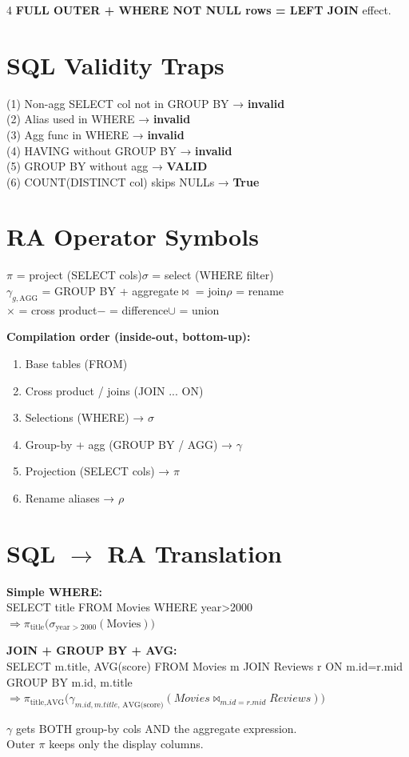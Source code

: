 \documentclass[8pt,letterpaper]{article}
\newcommand{\codefont}{\fontsize{4.2}{4.8}\selectfont\ttfamily}
\newcommand{\key}[1]{\textbf{\color{red!70!black}#1}}
\newcommand{\ans}[1]{\textbf{\color{blue!80!black}#1}}
\newcommand{\sql}[1]{{\codefont #1}}
\newcommand{\proj}{\ensuremath{\pi}}
\newcommand{\sel}{\ensuremath{\sigma}}
\newcommand{\agg}{\ensuremath{\gamma}}
\newcommand{\jn}{\ensuremath{\bowtie}}
\newcommand{\ren}{\ensuremath{\rho}}
\begin{document}
\begin{multicols*}{4}
\key{FULL OUTER + WHERE NOT NULL rows = LEFT JOIN} effect.

\section{SQL Validity Traps}
(1) Non-agg SELECT col not in GROUP BY → \ans{invalid}\\
(2) Alias used in WHERE → \ans{invalid}\\
(3) Agg func in WHERE → \ans{invalid}\\
(4) HAVING without GROUP BY → \ans{invalid}\\
(5) GROUP BY without agg → \ans{VALID}\\
(6) \sql{COUNT(DISTINCT col)} skips NULLs → \ans{True}

\section{RA Operator Symbols}
$\proj$ = project (SELECT cols)\quad $\sel$ = select (WHERE filter)\\
$\agg_{g,\text{AGG}}$ = GROUP BY + aggregate\quad $\jn$ = join\quad $\ren$ = rename\\
$\times$ = cross product\quad $-$ = difference\quad $\cup$ = union

\key{Compilation order (inside-out, bottom-up):}
\begin{enumerate}
  \item Base tables (FROM)
  \item Cross product / joins (JOIN ... ON)
  \item Selections (WHERE) → $\sel$
  \item Group-by + agg (GROUP BY / AGG) → $\agg$
  \item Projection (SELECT cols) → $\proj$
  \item Rename aliases → $\ren$
\end{enumerate}

\section{SQL $\to$ RA Translation}
\key{Simple WHERE:}\\
\sql{SELECT title FROM Movies WHERE year>2000}\\
$\Rightarrow \proj_{\text{title}}\bigl(\sel_{\text{year}>2000}(\text{Movies})\bigr)$

\key{JOIN + GROUP BY + AVG:}\\
\sql{SELECT m.title, AVG(score) FROM Movies m JOIN Reviews r ON m.id=r.mid GROUP BY m.id, m.title}\\
$\Rightarrow \proj_{\text{title},\text{AVG}}\bigl(\agg_{m.id,m.title,\,\text{AVG(score)}}(Movies \jn_{m.id=r.mid} Reviews)\bigr)$
\begin{warnbox}
$\agg$ gets BOTH group-by cols AND the aggregate expression.\\
Outer $\proj$ keeps only the display columns.
\end{warnbox}


\end{multicols*}
\end{document}
